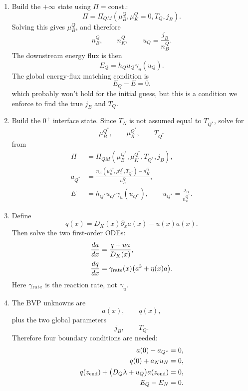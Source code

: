 \documentclass[11pt]{article}
\begin{document}
\begin{enumerate}
\item Build the $+\infty$ state using $\Pi=\mathrm{const.}$:
\begin{equation}
\Pi
=
\Pi_{QM}(\mu_B^Q,\mu_K^Q=0,T_Q,j_B).
\end{equation}
Solving this gives $\mu_B^Q$, and therefore
\begin{equation}
n_B^Q,\qquad n_K^Q,\qquad u_Q=\frac{j_B}{n_B^Q}.
\end{equation}
The downstream energy flux is then
\begin{equation}
E_Q
=
h_Q u_Q \gamma_u(u_Q).
\end{equation}
The global energy-flux matching condition is
\begin{equation}
E_Q-E=0.
\end{equation}
which probably won't hold for the initial guess, but this is a condition we enforce to find the true $j_B$ and $T_Q$.

\item Build the $0^+$ interface state. Since $T_N$ is not assumed equal to $T_{Q^\ast}$, solve for
\begin{equation}
\mu_B^{Q^\ast},\qquad \mu_K^{Q^\ast},\qquad T_{Q^\ast}
\end{equation}
from
\begin{align}
\Pi
&=
\Pi_{QM}(\mu_B^{Q^\ast},\mu_K^{Q^\ast},T_{Q^\ast},j_B),
\\
a_{Q^\ast}
&=
\frac{
n_K(\mu_B^{Q^\ast},\mu_K^{Q^\ast},T_{Q^\ast})-n_K^Q
}{n_B^Q},
\\
E
&=
h_{Q^\ast}u_{Q^\ast}\gamma_u(u_{Q^\ast}),
\qquad
u_{Q^\ast}
=
\frac{j_B}{n_B^{Q^\ast}}.
\end{align}

\item Define
\begin{equation}
q(x)=D_K(x)\partial_x a(x)-u(x)a(x).
\end{equation}
Then solve the two first-order ODEs:
\begin{align}
\frac{da}{dx}
&=
\frac{q+u a}{D_K(x)},
\\
\frac{dq}{dx}
&=
\gamma_{\rm rate}(x)\bigl(a^3+\eta(x)a\bigr).
\end{align}
Here $\gamma_{\rm rate}$ is the reaction rate, not $\gamma_u$.

\item The BVP unknowns are
\begin{equation}
a(x),\qquad q(x),
\end{equation}
plus the two global parameters
\begin{equation}
j_B,\qquad T_Q.
\end{equation}
Therefore four boundary conditions are needed:
\begin{align}
a(0)-a_{Q^\ast} &= 0,\\
q(0)+a_Nu_N &= 0,\\
q(z_{\rm end})+\bigl(D_Q\lambda+u_Q\bigr)a(z_{\rm end}) &= 0,\\
E_Q-E_N &= 0.
\end{align}


\end{enumerate}
\end{document}
